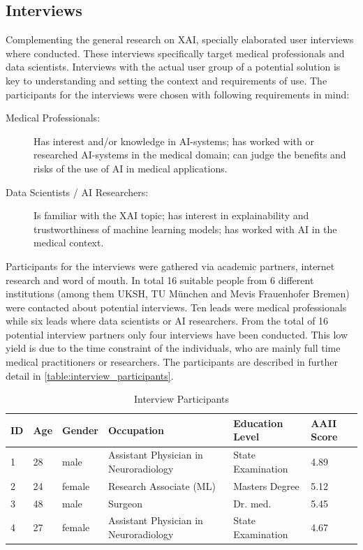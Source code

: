 \documentclass[11pt,a4paper,english]{scrreprt}
\begin{document}
\subsection{Interviews}\label{subsection:interviews}
Complementing the general research on XAI, specially elaborated user interviews where conducted. These interviews specifically target medical professionals and data scientists. Interviews with the actual user group of a potential solution is key to understanding and setting the context and requirements of use. The participants for the interviews were chosen with following requirements in mind:
\begin{description}
    \item[Medical Professionals:] Has interest and/or knowledge in AI-systems; has worked with or researched AI-systems in the medical domain; can judge the benefits and risks of the use of AI in medical applications.
    \item[Data Scientists / AI Researchers:] Is familiar with the XAI topic; has interest in explainability and trustworthiness of machine learning models; has worked with AI in the medical context.
\end{description}
Participants for the interviews were gathered via academic partners, internet research and word of mouth. In total 16 suitable people from 6 different institutions (among them UKSH, TU München and Mevis Frauenhofer Bremen) were contacted about potential interviews. Ten leads were medical professionals while six leads where data scientists or AI researchers. From the total of 16 potential interview partners only four interviews have been conducted. This low yield is due to the time constraint of the individuals, who are mainly full time medical practitioners or researchers. The participants are described in further detail in \autoref{table:interview_participants}.

\begin{table}[htbp]
    \centering
    \begin{tabularx}{\textwidth}{ l l l X X l }
        \toprule
        ID & Age & Gender & Occupation & Education Level & AAII Score \\
        \midrule
        1 & 28 & male & Assistant Physician in Neuroradiology & State Examination & 4.89 \\ 
        2 & 24 & female & Research Associate (ML) & Masters Degree & 5.12 \\ 
        3 & 48 & male & Surgeon & Dr. med. & 5.45 \\ 
        4 & 27 & female & Assistant Physician in Neuroradiology & State Examination & 4.67 \\ 
        \bottomrule
    \end{tabularx}
    \caption{Interview Participants}
    \label{table:interview_participants}
\end{table}
\end{document}
